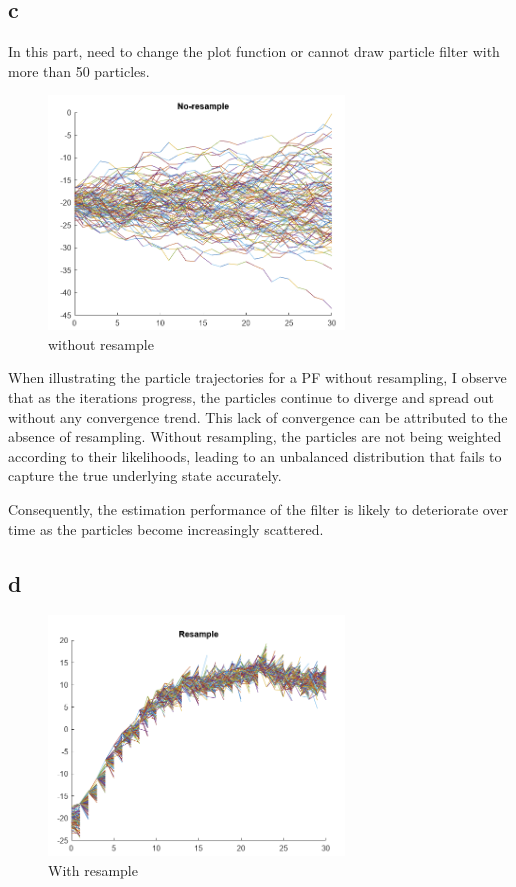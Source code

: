 \subsection{c}

In this part, need to change the plot function or cannot draw particle filter with more than 50 particles.

\begin{figure}[H]
    \centering
    \includegraphics[width=0.7\textwidth]{images/withoutresample.png}
    \caption{without resample}
    \label{without}
   \end{figure}

When illustrating the particle trajectories for a PF without resampling, I observe that as the iterations progress, the particles continue to diverge and spread out without any convergence trend. This lack of convergence can be attributed to the absence of resampling. Without resampling, the particles are not being weighted according to their likelihoods, leading to an unbalanced distribution that fails to capture the true underlying state accurately. 

Consequently, the estimation performance of the filter is likely to deteriorate over time as the particles become increasingly scattered.


\subsection{d}



\begin{figure}[H]
    \centering
    \includegraphics[width=0.7\textwidth]{images/resample.png}
    \caption{With resample}
    \label{resample}
   \end{figure}

